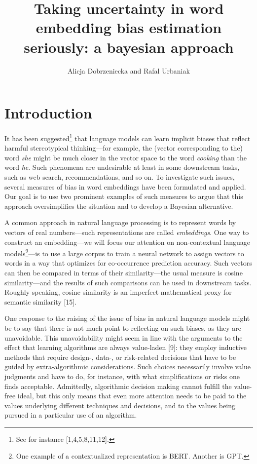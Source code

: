 \documentclass[
  12pt,
  dvipsnames,enabledeprecatedfontcommands]{scrartcl}
\title{Taking uncertainty in word embedding bias estimation seriously: a
bayesian approach}
\author{Alicja Dobrzeniecka and Rafal Urbaniak}
\date{}
\begin{document}
\maketitle

\hypertarget{introduction}{%
\section{Introduction}\label{introduction}}

It has been suggested\footnote{See for instance {[}1,4,5,8,11,12{]}.}
that language models can learn implicit biases that reflect harmful
stereotypical thinking---for example, the (vector corresponding to the)
word \textit{she} might be much closer in the vector space to the word
\textit{cooking} than the word \textit{he}. Such phenomena are
undesirable at least in some downstream tasks, such as web search,
recommendations, and so on. To investigate such issues, several measures
of bias in word embeddings have been formulated and applied. Our goal is
to use two prominent examples of such measures to argue that this
approach oversimplifies the situation and to develop a Bayesian
alternative.

A common approach in natural language processing is to represent words
by vectors of real numbers---such representations are called
\emph{embeddings}. One way to construct an embedding---we will focus our
attention on non-contextual language models\footnote{One example of a
  contextualized representation is BERT. Another is GPT.}---is to use a
large corpus to train a neural network to assign vectors to words in a
way that optimizes for co-occurrence prediction accuracy. Such vectors
can then be compared in terms of their similarity---the usual measure is
cosine similarity---and the results of such comparisons can be used in
downstream tasks. Roughly speaking, cosine similarity is an imperfect
mathematical proxy for semantic similarity {[}15{]}.

One response to the raising of the issue of bias in natural language
models might be to say that there is not much point to reflecting on
such biases, as they are unavoidable. This unavoidability might seem in
line with the arguments to the effect that learning algorithms are
always value-laden {[}9{]}: they employ inductive methods that require
design-, data-, or risk-related decisions that have to be guided by
extra-algorithmic considerations. Such choices necessarily involve value
judgments and have to do, for instance, with what simplifications or
risks one finds acceptable. Admittedly, algorithmic decision making
cannot fulfill the value-free ideal, but this only means that even more
attention needs to be paid to the values underlying different techniques
and decisions, and to the values being pursued in a particular use of an
algorithm.
\end{document}
